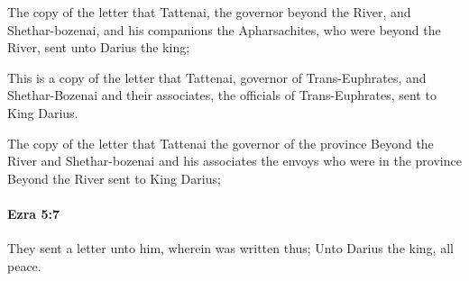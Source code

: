 			\begin{versebox}
					\item[BHS] 
					\item[LXX] 
					\item[ASV] The copy of the letter that Tattenai, the governor beyond the River, and Shethar-bozenai, and his companions the Apharsachites, who were beyond the River, sent unto Darius the king;
					\item[NIV] This is a copy of the letter that Tattenai, governor of Trans-Euphrates, and Shethar-Bozenai and their associates, the officials of Trans-Euphrates, sent to King Darius.
					\item[NRSV] The copy of the letter that Tattenai the governor of the province Beyond the River and Shethar-bozenai and his associates the envoys who were in the province Beyond the River sent to King Darius;
			\end{versebox}

		\paragraph{Ezra 5:7} %
			\label{EZRA-5-7}

			They sent a letter unto him, wherein was written thus; Unto Darius the king, all peace.

